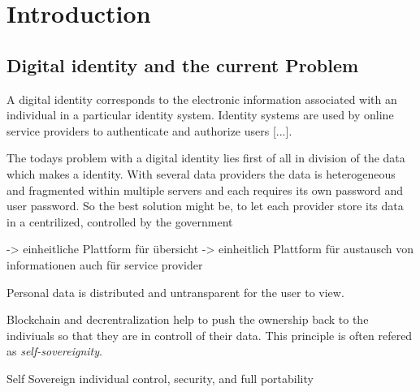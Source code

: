 \chapter{Introduction}
\label{cha:introduction}
\section{Digital identity and the current Problem}
A digital identity corresponds to the electronic information associated with an individual
in a particular identity system. Identity systems are used by online service providers to authenticate and authorize users [...].\cite{digitalIdentity}

The todays problem with a digital identity lies first of all in division of the data which makes a identity. With several data providers the data is heterogeneous and fragmented within multiple servers and each requires its own password and user password. So the best solution might be, to let each provider store its data in a centrilized, controlled by the government 

-> einheitliche Plattform für übersicht
-> einheitlich Plattform für austausch von informationen auch für service provider



Personal data is distributed and untransparent for the user to view.\cite[p. 1]{uPortWhitePaper}

Blockchain and decrentralization help to push the ownership back to the indiviuals so that they are in controll of their data. This principle is often refered as \textit{self-sovereignity}.\cite[p. 1]{uPortWhitePaper}






Self Sovereign individual control, security, and full portability
